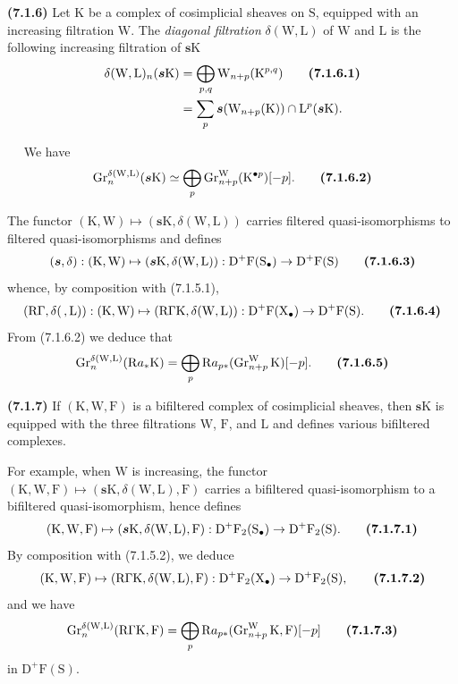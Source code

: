 \documentclass[11pt,leqno]{article}
\newcommand{\Page}[1]{\ifvmode\noindent\else\unskip\ \fi{\footnotesize\textcolor{gray}{[p.\,#1]}}\ \ignorespaces}
\begin{document}
\textbf{(7.1.6)} Let \(\mathrm{K}\) be a complex of cosimplicial sheaves on \(\mathrm{S}\), equipped with an increasing filtration \(\mathrm{W}\). The \textit{diagonal filtration} \(\delta(\mathrm{W},\mathrm{L})\) of \(\mathrm{W}\) and \(\mathrm{L}\) is the following increasing filtration of \(\boldsymbol{s}\mathrm{K}\)
\begin{align*}
\delta(\mathrm{W},\mathrm{L})_n(\boldsymbol{s}\mathrm{K})
&=\bigoplus_{p,q}\mathrm{W}_{n+p}(\mathrm{K}^{p,q})
\tag*{\textbf{(7.1.6.1)}}\\
&=\sum_p\boldsymbol{s}(\mathrm{W}_{n+p}(\mathrm{K}))
\cap\mathrm{L}^{p}(\boldsymbol{s}\mathrm{K}).
\end{align*}

\Page{25}
We have
\[
\operatorname{Gr}_{n}^{\delta(\mathrm{W},\mathrm{L})}
(\boldsymbol{s}\mathrm{K})
\simeq
\bigoplus_p\operatorname{Gr}_{n+p}^{\mathrm{W}}
(\mathrm{K}^{\bullet p})[-p].
\tag*{\textbf{(7.1.6.2)}}
\]

The functor \((\mathrm{K},\mathrm{W})\mapsto
(\boldsymbol{s}\mathrm{K},\delta(\mathrm{W},\mathrm{L}))\) carries filtered quasi-isomorphisms to filtered quasi-isomorphisms and defines
\[
(\boldsymbol{s},\delta):
(\mathrm{K},\mathrm{W})\mapsto
(\boldsymbol{s}\mathrm{K},\delta(\mathrm{W},\mathrm{L})):
\mathrm{D}^{+}\mathrm{F}(\mathrm{S}_{\bullet})
\to\mathrm{D}^{+}\mathrm{F}(\mathrm{S})
\tag*{\textbf{(7.1.6.3)}}
\]
whence, by composition with (7.1.5.1),
\[
(\mathrm{R}\Gamma,\delta(\, ,\mathrm{L})):
(\mathrm{K},\mathrm{W})\mapsto
(\mathrm{R}\Gamma\mathrm{K},\delta(\mathrm{W},\mathrm{L})):
\mathrm{D}^{+}\mathrm{F}(\mathrm{X}_{\bullet})
\to\mathrm{D}^{+}\mathrm{F}(\mathrm{S}).
\tag*{\textbf{(7.1.6.4)}}
\]
From (7.1.6.2) we deduce that
\[
\operatorname{Gr}_{n}^{\delta(\mathrm{W},\mathrm{L})}
(\mathrm{R}a_{\ast}\mathrm{K})
=\bigoplus_p\mathrm{R}a_{p\ast}
(\operatorname{Gr}_{n+p}^{\mathrm{W}}\mathrm{K})[-p].
\tag*{\textbf{(7.1.6.5)}}
\]

\textbf{(7.1.7)} If \((\mathrm{K},\mathrm{W},\mathrm{F})\) is a bifiltered complex of cosimplicial sheaves, then \(\boldsymbol{s}\mathrm{K}\) is equipped with the three filtrations \(\mathrm{W}\), \(\mathrm{F}\), and \(\mathrm{L}\) and defines various bifiltered complexes.

For example, when \(\mathrm{W}\) is increasing, the functor \((\mathrm{K},\mathrm{W},\mathrm{F})\mapsto
(\boldsymbol{s}\mathrm{K},\delta(\mathrm{W},\mathrm{L}),\mathrm{F})\)  carries a bifiltered quasi-isomorphism to a bifiltered quasi-isomorphism, hence defines
\[
(\mathrm{K},\mathrm{W},\mathrm{F})\mapsto
(\boldsymbol{s}\mathrm{K},\delta(\mathrm{W},\mathrm{L}),\mathrm{F}):
\mathrm{D}^{+}\mathrm{F}_2(\mathrm{S}_{\bullet})
\to\mathrm{D}^{+}\mathrm{F}_2(\mathrm{S}).
\tag*{\textbf{(7.1.7.1)}}
\]
By composition with (7.1.5.2), we deduce
\[
(\mathrm{K},\mathrm{W},\mathrm{F})\mapsto
(\mathrm{R}\Gamma\mathrm{K},\delta(\mathrm{W},\mathrm{L}),\mathrm{F}):
\mathrm{D}^{+}\mathrm{F}_2(\mathrm{X}_{\bullet})
\to\mathrm{D}^{+}\mathrm{F}_2(\mathrm{S}),
\tag*{\textbf{(7.1.7.2)}}
\]
and we have
\[
\operatorname{Gr}_{n}^{\delta(\mathrm{W},\mathrm{L})}
(\mathrm{R}\Gamma\mathrm{K},\mathrm{F})
=\bigoplus_p\mathrm{R}a_{p\ast}
(\operatorname{Gr}_{n+p}^{\mathrm{W}}\mathrm{K},\mathrm{F})[-p]
\tag*{\textbf{(7.1.7.3)}}
\]
in \(\mathrm{D}^{+}\mathrm{F}(\mathrm{S})\).
\end{document}

